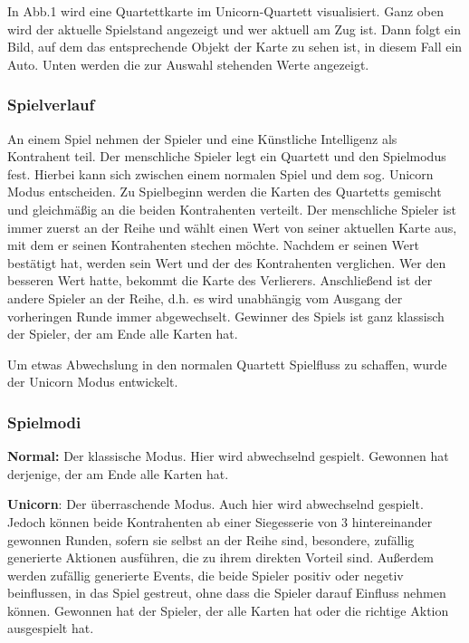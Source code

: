 \documentclass{scrartcl}
\begin{document}
In Abb.1 wird eine Quartettkarte im Unicorn-Quartett visualisiert.
Ganz oben wird der aktuelle Spielstand angezeigt und wer aktuell am Zug ist.
Dann folgt ein Bild, auf dem das entsprechende Objekt der Karte zu sehen ist, in diesem Fall ein Auto.
Unten werden die zur Auswahl stehenden Werte angezeigt.


\subsubsection{Spielverlauf}
An einem Spiel nehmen der Spieler und eine Künstliche Intelligenz als Kontrahent teil.
Der menschliche Spieler legt ein Quartett und den Spielmodus fest.
Hierbei kann sich zwischen einem normalen Spiel und dem sog. Unicorn Modus entscheiden.
Zu Spielbeginn werden die Karten des Quartetts gemischt und gleichmäßig an die beiden Kontrahenten verteilt.
Der menschliche Spieler ist immer zuerst an der Reihe und wählt einen Wert von seiner aktuellen Karte aus, mit dem er seinen Kontrahenten stechen möchte.
Nachdem er seinen Wert bestätigt hat, werden sein Wert und der des Kontrahenten verglichen. Wer den besseren Wert hatte, bekommt die Karte des Verlierers.
Anschließend ist der andere Spieler an der Reihe, d.h. es wird unabhängig vom Ausgang der vorheringen Runde immer abgewechselt.
Gewinner des Spiels ist ganz klassisch der Spieler, der am Ende alle Karten hat.

Um etwas Abwechslung in den normalen Quartett Spielfluss zu schaffen, wurde der Unicorn Modus entwickelt.

\subsubsection{Spielmodi}

\textbf{Normal:}
Der klassische Modus. Hier wird abwechselnd gespielt. Gewonnen hat derjenige, der am Ende alle Karten hat.

\newline
\textbf{Unicorn}:
Der überraschende Modus. Auch hier wird abwechselnd gespielt. Jedoch können beide Kontrahenten ab einer Siegesserie von 3 hintereinander gewonnen Runden, sofern sie selbst
an der Reihe sind, besondere, zufällig generierte Aktionen ausführen, die zu ihrem direkten Vorteil sind.
Außerdem werden zufällig generierte Events, die beide Spieler positiv oder negetiv beinflussen, in das Spiel gestreut, ohne dass die Spieler darauf Einfluss nehmen können.
Gewonnen hat der Spieler, der alle Karten hat oder die richtige Aktion ausgespielt hat.
\end{document}
